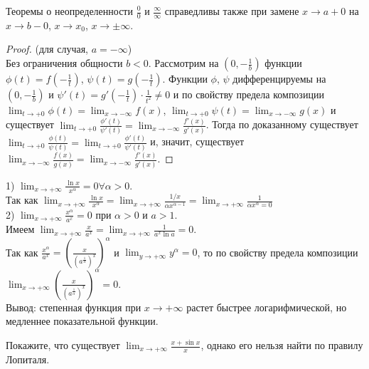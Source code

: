 \begin{note}
    Теоремы о неопределенности \hyperlink{zero_on_zero_th}{$\frac{0}{0}$} и \hyperlink{inf_on_inf_th}{$\frac{\infty}{\infty}$}
    справедливы также при замене $x \to a+0$ на $x \to b-0$, $x \to x_0$, $x \to \pm \infty$.
\end{note}

\begin{proof} (для случая, $a = -\infty$)\\
    Без ограничения общности $b < 0$.
    Рассмотрим на $(0, -\frac{1}{b})$ функции
    $\phi(t) = f(-\frac{1}{t})$, $\psi(t) = g(-\frac{1}{t})$.
    Функции $\phi$, $\psi$ дифференцируемы на $(0, -\frac{1}{b})$
    и $\psi'(t) = g'(-\frac{1}{t}) \cdot  \frac{1}{t^2} \neq 0$
    и по свойству предела композиции $\lim_{t \to +0} \phi(t) = \lim_{x \to -\infty} f(x)$, $\lim_{t \to +0} \psi(t) = \lim_{x \to -\infty} g(x)$
    и существует $\lim_{t \to +0} \frac{\phi'(t)}{\psi'(t)} = \lim_{x \to -\infty} \frac{f'(x)}{g'(x)}$.
    Тогда по доказанному существует $\lim_{t \to +0} \frac{\phi(t)}{\psi(t)} = \lim_{t \to +0} \frac{\phi'(t)}{\psi'(t)}$ и, значит, существует $\lim_{x \to -\infty} \frac{f(x)}{g(x)} = \lim_{x \to -\infty} \frac{f'(x)}{g'(x)}$.
\end{proof}

\begin{example}
    1) $\lim_{x \to +\infty} \frac{\ln x}{x^{\alpha}} = 0 \forall \alpha > 0$.\\
    Так как $\lim_{x \to +\infty} \frac{\ln x}{x^{\alpha}} = \lim_{x \to +\infty} \frac{1/x}{\alpha x^{\alpha-1}} = \lim_{x \to +\infty} \frac{1}{\alpha x^{\alpha} = 0}$\\
    2) $\lim_{x \to +\infty} \frac{x^{\alpha}}{a^{x}} = 0$ при $\alpha > 0$ и $a > 1$.\\
    Имеем $\lim_{x \to +\infty} \frac{x}{a^{x}} = \lim_{x \to +\infty} \frac{1}{a^{x} \ln a} = 0$.\\
    Так как $\frac{x^{\alpha}}{a^{x}} = (\frac{x}{(a^{\frac{1}{\alpha}})^x})^{\alpha}$ и $\lim_{y \to +\infty} y^{\alpha} = 0$, то по свойству предела композиции $\lim_{x \to +\infty} (\frac{x}{(a^{\frac{1}{\alpha}})^x})^{\alpha} = 0$.\\
    Вывод: степенная функция при $x \to +\infty$ растет быстрее логарифмической, но медленнее показательной функции.
\end{example}

\begin{problem}
    Покажите, что существует $\lim_{x \to +\infty} \frac{x+ \sin x}{x}$,
    однако его нельзя найти по правилу Лопиталя.
\end{problem}

